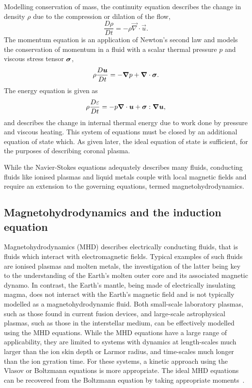 Modelling conservation of mass, the continuity equation describes the change in density $\rho$ due to the compression or dilation of the flow,
\begin{equation}
\frac{D\rho}{Dt} = - \rho \vec{\nabla} \cdot \vec{u}.
\label{eq:ns_continuity}
\end{equation}
The momentum equation is an application of Newton's second law and models the conservation of momentum in a fluid with a scalar thermal pressure $p$ and viscous stress tensor ${\bm \sigma}$,
\begin{equation}
\rho\frac{D{\bm u}}{Dt} = -{\bm \nabla} p + {\bm \nabla} \cdot {\bm \sigma}.
\label{eq:ns_momentum}
\end{equation}
The energy equation is given as
\begin{equation}
\rho\frac{D\varepsilon}{Dt} = -p {\bm \nabla} \cdot {\bm u} + {\bm \sigma} : {\bm \nabla}{\bm u},
\label{eq:ns_energy}
\end{equation}
and describes the change in internal thermal energy due to work done by pressure and viscous heating. This system of equations must be closed by an additional equation of state which. As given later, the ideal equation of state is sufficient, for the purposes of describing coronal plasma.

While the Navier-Stokes equations adequately describes many fluids, conducting fluids like ionised plasmas and liquid metals couple with local magnetic fields and require an extension to the governing equations, termed magnetohydrodynamics.

\subsection{Magnetohydrodynamics and the induction equation}

Magnetohydrodynamics (MHD) describes electrically conducting fluids, that is fluids which interact with electromagnetic fields. Typical examples of such fluids are ionised plasmas and molten metals, the investigation of the latter being key to the understanding of the Earth's molten outer core and its associated magnetic dynamo. In contrast, the Earth's mantle, being made of electrically insulating magma, does not interact with the Earth's magnetic field and is not typically modelled as a magnetohydrodynamic fluid. Both small-scale laboratory plasmas, such as those found in current fusion devices, and large-scale astrophysical plasmas, such as those in the interstellar medium, can be effectively modelled using the MHD equations. While the MHD equations have a large range of applicability, they are limited to systems with dynamics at length-scales much larger than the ion skin depth or Larmor radius, and time-scales much longer than the ion gyration time. For these systems, a kinetic approach using the Vlasov or Boltzmann equations is more appropriate. The ideal MHD equations can be recovered from the Boltzmann equation by taking appropriate moments~\cite{boydPhysicsPlasmas2003}.

